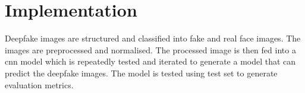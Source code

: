        \section{Implementation}
        Deepfake images are structured and classified into fake and real face images. The images are preprocessed and normalised. The processed image is then fed into a \acrfull*{cnn} model which is repeatedly tested and iterated to generate a model that can predict the deepfake images. The model is tested using test set to generate evaluation metrics.
        \vspace{0.5in}
        \newpage
        \begin{figure}[hbt!]
        \end{figure}


